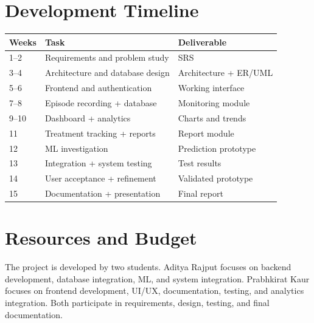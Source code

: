 \documentclass[11pt,a4paper]{article}
\begin{document}
\begin{center}
\end{center}

\section{Development Timeline}

\begin{center}
\small
\begin{tabular}{p{}p{}p{}}
\toprule
\textbf{Weeks} & \textbf{Task} & \textbf{Deliverable}\\
\midrule
1--2 & Requirements and problem study & SRS\\
3--4 & Architecture and database design & Architecture + ER/UML\\
5--6 & Frontend and authentication & Working interface\\
7--8 & Episode recording + database & Monitoring module\\
9--10 & Dashboard + analytics & Charts and trends\\
11 & Treatment tracking + reports & Report module\\
12 & ML investigation & Prediction prototype\\
13 & Integration + system testing & Test results\\
14 & User acceptance + refinement & Validated prototype\\
15 & Documentation + presentation & Final report\\
\bottomrule
\end{tabular}
\end{center}


\section{Resources and Budget}

The project is developed by two students. Aditya Rajput focuses on backend development, database integration, ML, and system integration. Prabhkirat Kaur focuses on frontend development, UI/UX, documentation, testing, and analytics integration. Both participate in requirements, design, testing, and final documentation.
\end{document}
